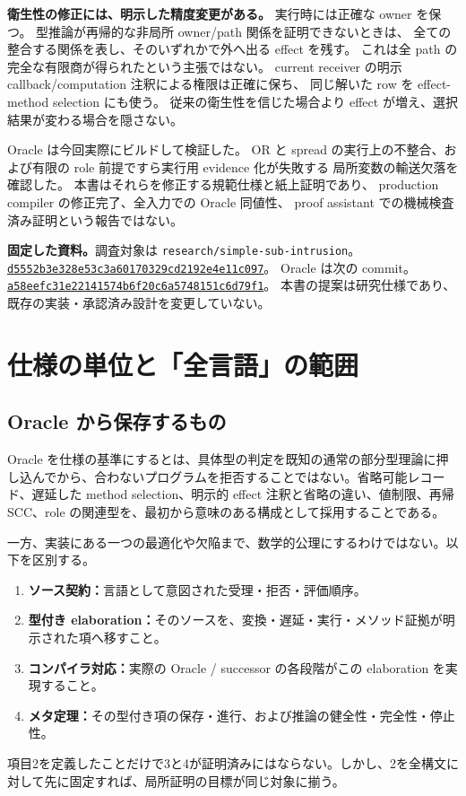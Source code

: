 \documentclass[11pt,a4paper]{article}
\theoremstyle{remark}
\begin{document}
\textbf{衛生性の修正には、明示した精度変更がある。}
実行時には正確な owner を保つ。
型推論が再帰的な非局所 owner/path 関係を証明できないときは、
全ての整合する関係を表し、そのいずれかで外へ出る effect を残す。
これは全 path の完全な有限商が得られたという主張ではない。
current receiver の明示 callback/computation 注釈による権限は正確に保ち、
同じ解いた row を effect-method selection にも使う。
従来の衛生性を信じた場合より effect が増え、選択結果が変わる場合を隠さない。

Oracle は今回実際にビルドして検証した。
OR と spread の実行上の不整合、および有限の role 前提ですら実行用 evidence 化が失敗する
局所変数の輸送欠落を確認した。
本書はそれらを修正する規範仕様と紙上証明であり、
production compiler の修正完了、全入力での Oracle 同値性、
proof assistant での機械検査済み証明という報告ではない。

\textbf{固定した資料。}調査対象は \texttt{research/simple-sub-intrusion}。\\
\href{https://github.com/momota1029/yulang/tree/d5552b3e328e53c3a60170329cd2192e4e11c097}{\texttt{d5552b3e328e53c3a60170329cd2192e4e11c097}}。
Oracle は次の commit。\\
\href{https://github.com/momota1029/yulang/tree/a58eefc31e22141574b6f20c6a5748151c6d79f1}{\texttt{a58eefc31e22141574b6f20c6a5748151c6d79f1}}。
本書の提案は研究仕様であり、既存の実装・承認済み設計を変更していない。

\clearpage
\begingroup
\small
\setlength{\parskip}{0pt}
\tableofcontents
\endgroup
\newpage

\section{仕様の単位と「全言語」の範囲}

\subsection{Oracle から保存するもの}

Oracle を仕様の基準にするとは、具体型の判定を既知の通常の部分型理論に押し込んでから、合わないプログラムを拒否することではない。省略可能レコード、遅延した method selection、明示的 effect 注釈と省略の違い、値制限、再帰 SCC、role の関連型を、最初から意味のある構成として採用することである。

一方、実装にある一つの最適化や欠陥まで、数学的公理にするわけではない。以下を区別する。
\begin{enumerate}
\item \textbf{ソース契約：}言語として意図された受理・拒否・評価順序。
\item \textbf{型付き elaboration：}そのソースを、変換・遅延・実行・メソッド証拠が明示された項へ移すこと。
\item \textbf{コンパイラ対応：}実際の Oracle / successor の各段階がこの elaboration を実現すること。
\item \textbf{メタ定理：}その型付き項の保存・進行、および推論の健全性・完全性・停止性。
\end{enumerate}
項目2を定義したことだけで3と4が証明済みにはならない。しかし、2を全構文に対して先に固定すれば、局所証明の目標が同じ対象に揃う。
\end{document}
